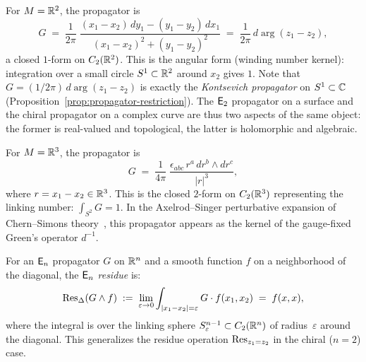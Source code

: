 \begin{example}[\texorpdfstring{$n = 2$}{n = 2}: the \texorpdfstring{$\Etwo$}{E2} propagator on \texorpdfstring{$\bR^2$}{R2}]
\label{ex:n2-propagator}
For $M = \mathbb{R}^2$, the propagator is
\[
G \;=\;
\frac{1}{2\pi}\;
\frac{(x_1 - x_2)\, dy_1 - (y_1 - y_2)\, dx_1}
     {(x_1 - x_2)^2 + (y_1 - y_2)^2}
\;=\;
\frac{1}{2\pi}\, d\arg(z_1 - z_2),
\]
a closed $1$-form on $C_2(\mathbb{R}^2)$.  This is the angular form
(winding number kernel): integration over a small circle
$S^1 \subset \mathbb{R}^2$ around $x_2$ gives $1$.  Note that
$G = (1/2\pi)\, d\arg(z_1 - z_2)$ is exactly the
\emph{Kontsevich propagator} on $S^1 \subset \mathbb{C}$
(Proposition~\ref{prop:propagator-restriction}).  The $\Etwo$
propagator on a surface and the chiral propagator on a complex curve
are thus two aspects of the same object: the former is real-valued
and topological, the latter is holomorphic and algebraic.
\end{example}

\begin{example}[\texorpdfstring{$n = 3$}{n = 3}: the Chern--Simons propagator]
\label{ex:n3-propagator}
For $M = \mathbb{R}^3$, the propagator is
\[
G \;=\;
\frac{1}{4\pi}\;
\frac{\epsilon_{abc}\, r^a\, dr^b \wedge dr^c}{|r|^3},
\]
where $r = x_1 - x_2 \in \mathbb{R}^3$.  This is the closed $2$-form on
$C_2(\mathbb{R}^3)$ representing the linking number:
$\int_{S^2} G = 1$.  In the Axelrod--Singer perturbative expansion of
Chern--Simons theory~\cite{Kon94}, this propagator appears as the
kernel of the gauge-fixed Green's operator $d^{-1}$.
\end{example}

\begin{proposition}
\label{prop:linking-sphere-residue}
For an $\mathsf{E}_n$ propagator $G$ on $\mathbb{R}^n$ and a smooth function
$f$ on a neighborhood of the diagonal, the \emph{$\mathsf{E}_n$ residue} is:
\begin{equation}\label{eq:en-residue}
\operatorname{Res}_\Delta(G \wedge f)
\;:=\;
\lim_{\varepsilon \to 0}
\int_{|x_1 - x_2| = \varepsilon} G \cdot f(x_1, x_2)
\;=\; f(x, x),
\end{equation}
where the integral is over the linking sphere
$S^{n-1}_\varepsilon \subset C_2(\mathbb{R}^n)$ of radius~$\varepsilon$
around the diagonal.  This generalizes the residue operation
$\operatorname{Res}_{z_1 = z_2}$ in the chiral ($n = 2$) case.
\end{proposition}

